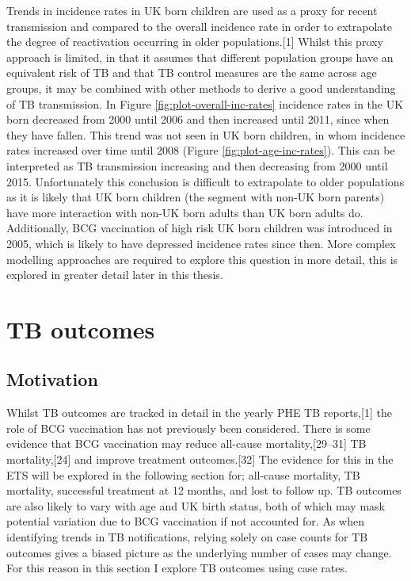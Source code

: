 \documentclass[11pt,twoside]{bristolthesis}
\begin{document}
  Trends in incidence rates in UK born children are used as a proxy for recent transmission and compared to the overall incidence rate in order to extrapolate the degree of reactivation occurring in older populations.{[}1{]} Whilst this proxy approach is limited, in that it assumes that different population groups have an equivalent risk of TB and that TB control measures are the same across age groups, it may be combined with other methods to derive a good understanding of TB transmission. In Figure \ref{fig:plot-overall-inc-rates} incidence rates in the UK born decreased from 2000 until 2006 and then increased until 2011, since when they have fallen. This trend was not seen in UK born children, in whom incidence rates increased over time until 2008 (Figure \ref{fig:plot-age-inc-rates}). This can be interpreted as TB transmission increasing and then decreasing from 2000 until 2015. Unfortunately this conclusion is difficult to extrapolate to older populations as it is likely that UK born children (the segment with non-UK born parents) have more interaction with non-UK born adults than UK born adults do. Additionally, BCG vaccination of high risk UK born children was introduced in 2005, which is likely to have depressed incidence rates since then. More complex modelling approaches are required to explore this question in more detail, this is explored in greater detail later in this thesis.
  
  \hypertarget{tb-outcomes}{%
  \section{TB outcomes}\label{tb-outcomes}}
  
  \hypertarget{motivation-1}{%
  \subsection{Motivation}\label{motivation-1}}
  
  Whilst TB outcomes are tracked in detail in the yearly PHE TB reports,{[}1{]} the role of BCG vaccination has not previously been considered. There is some evidence that BCG vaccination may reduce all-cause mortality,{[}29--31{]} TB mortality,{[}24{]} and improve treatment outcomes.{[}32{]} The evidence for this in the ETS will be explored in the following section for; all-cause mortality, TB mortality, successful treatment at 12 months, and lost to follow up. TB outcomes are also likely to vary with age and UK birth status, both of which may mask potential variation due to BCG vaccination if not accounted for. As when identifying trends in TB notifications, relying solely on case counts for TB outcomes gives a biased picture as the underlying number of cases may change. For this reason in this section I explore TB outcomes using case rates.
  
\end{document}
